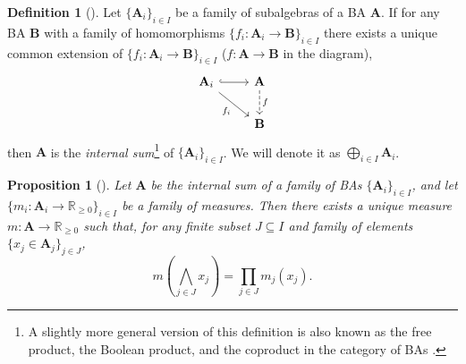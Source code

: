 \documentclass{article}
\newtheorem{proposition}[theorem]{Proposition}
\theoremstyle{definition}
\newtheorem{definition}[theorem]{Definition}
\theoremstyle{remark}
\begin{document}
\begin{definition}[\cite{givant2008introduction}]
  Let $\{ \mathbf{A}_i \}_{i \in I}$ be a family of subalgebras of a BA
  $\mathbf{A}$. If for any BA $\mathbf{B}$ with a family of homomorphisms $\{
  f_i\colon \mathbf{A}_i \to \mathbf{B} \}_{i \in I}$ there exists a unique
  common extension of $\{ f_i\colon \mathbf{A}_i \to \mathbf{B} \}_{i \in I}$
  ($f\colon \mathbf{A} \to \mathbf{B}$ in the diagram),
  \[
    \begin{tikzcd}
      \mathbf{A}_i \ar[r,hookrightarrow] \arrow{rd}[swap]{f_i} & \mathbf{A}
      \arrow[d,dashed,"f"] \\
      & \mathbf{B}
    \end{tikzcd}
  \]
  then $\mathbf{A}$ is the \emph{internal sum}\footnote{A slightly more general
    version of this definition is also known as the free product, the Boolean
    product, and the coproduct in the category of BAs
    \cite{givant2008introduction,koppelberg1989handbook,sikorski1969boolean}.}
  of $\{\mathbf{A}_i \}_{i \in I}$. We will denote it as $\bigoplus_{i \in I}
  \mathbf{A}_i$.
\end{definition}

\begin{proposition}[\cite{sikorski1969boolean}]
  Let $\mathbf{A}$ be the internal sum of a family of BAs $\{ \mathbf{A}_i \}_{i
    \in I}$, and let $\{m_i\colon \mathbf{A}_i \to \mathbb{R}_{\ge 0} \}_{i \in
    I}$ be a family of measures. Then there exists a unique measure $m\colon
  \mathbf{A} \to \mathbb{R}_{\ge 0}$ such that, for any finite subset $J
  \subseteq I$ and family of elements $\{ x_j \in \mathbf{A}_j \}_{j \in J}$,
  \[
    m \left( \bigwedge_{j \in J} x_j \right) = \prod_{j \in J} m_j(x_j).
  \]
\end{proposition}
\end{document}
